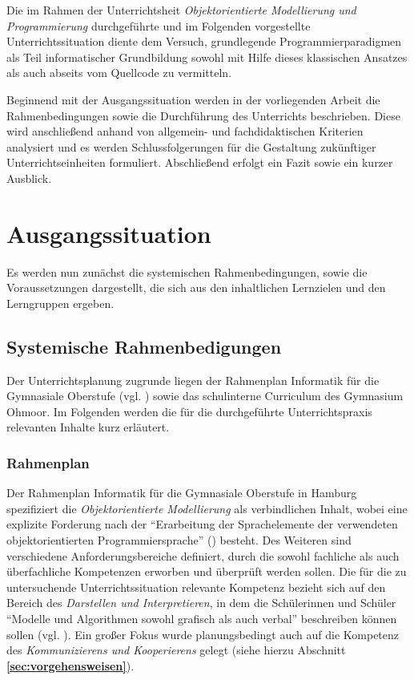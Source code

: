 \documentclass[paper=a4, DIV=13, BCOR=8mm, oneside=on, onecolumn=on, open = any, titlepage =on, parskip =half-, headsepline = on, footsepline = off, chapterprefix = on, sectionprefix = on, appendixprefix = off, fontsize = 12pt, numbers = noenddot, abstract = off]{scrreprt}
\begin{document}
Die im Rahmen der Unterrichtsheit \emph{Objektorientierte Modellierung und Programmierung} durchgeführte und im Folgenden vorgestellte Unterrichtssituation diente dem Versuch, grundlegende Programmierparadigmen als Teil informatischer Grundbildung sowohl mit Hilfe dieses klassischen Ansatzes als auch abseits vom Quellcode zu vermitteln.

Beginnend mit der Ausgangssituation werden in der vorliegenden Arbeit die Rahmenbedingungen sowie die Durchführung des Unterrichts beschrieben. Diese wird anschließend anhand von allgemein- und fachdidaktischen Kriterien analysiert und es werden Schlussfolgerungen für die Gestaltung zukünftiger Unterrichtseinheiten formuliert. Abschließend erfolgt ein Fazit sowie ein kurzer Ausblick.

\newpage
\par\singlespacing
\chapter{Ausgangssituation}
\onehalfspacing
\vspace*{-1cm}
Es werden nun zunächst die systemischen Rahmenbedingungen, sowie die Voraussetzungen dargestellt, die sich aus den inhaltlichen Lernzielen und den Lerngruppen ergeben.
\par\singlespacing
\section{Systemische Rahmenbedigungen}
\onehalfspacing
Der Unterrichtsplanung zugrunde liegen der Rahmenplan Informatik für die Gymnasiale Oberstufe (vgl. \cite{oberstufe:09}) sowie das schulinterne Curriculum des Gymnasium Ohmoor. Im Folgenden werden die für die durchgeführte Unterrichtspraxis relevanten Inhalte kurz erläutert.
\par\singlespacing
\subsection{Rahmenplan}
\onehalfspacing
Der Rahmenplan Informatik für die Gymnasiale Oberstufe in Hamburg spezifiziert die \textit{Objektorientierte Modellierung} als verbindlichen Inhalt, wobei eine explizite Forderung nach der "`Erarbeitung der Sprachelemente der verwendeten objektorientierten Programmiersprache"' (\cite[S.17]{oberstufe:09}) besteht. Des Weiteren sind verschiedene Anforderungsbereiche definiert, durch die sowohl fachliche als auch überfachliche Kompetenzen erworben und überprüft werden sollen. Die für die zu untersuchende Unterrichtssituation relevante Kompetenz bezieht sich auf den Bereich des \textit{Darstellen und Interpretieren}, in dem die Schülerinnen und Schüler "`Modelle und Algorithmen sowohl grafisch als auch verbal"' beschreiben können sollen (vgl. \cite[S.16]{oberstufe:09}). Ein großer Fokus wurde planungsbedingt auch auf die Kompetenz des \textit{Kommunizierens und Kooperierens} gelegt (siehe hierzu Abschnitt \textbf{\ref{sec:vorgehensweisen}}).
\end{document}
